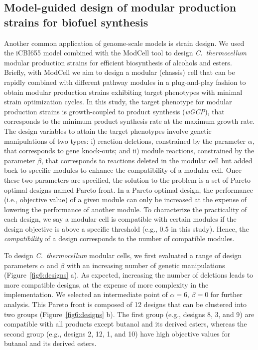 \subsection{Model-guided design of modular production strains for biofuel synthesis}

Another common application of genome-scale models is strain design.\citep{long2015, ng2015, maranas2016, wang2018, garcia2019, garcia2019b, garcia2019c}
We used the iCBI655 model combined with the ModCell tool\citep{garcia2020b} to design \textit{C.~thermocellum} modular production strains for efficient biosynthesis of alcohols and esters.
Briefly, with ModCell we aim to design a modular (chassis) cell that can be rapidly combined with different pathway modules in a plug-and-play fashion to obtain modular production strains exhibiting target phenotypes with minimal strain optimization cycles.
In this study, the target phenotype for modular production strains is growth-coupled to product synthesis (\textit{wGCP}), that corresponds to the minimum product synthesis rate at the maximum growth rate.
The design variables to attain the target phenotypes involve genetic manipulations of two types: i) reaction deletions, constrained by the parameter $\alpha$, that corresponds to gene knock-outs; and ii) module reactions, constrained by the parameter $\beta$, that corresponds to reactions deleted in the modular cell but added back to specific modules to enhance the compatibility of a modular cell. Once these two parameters are specified, the solution to the problem is a set of Pareto optimal designs named Pareto front. In a Pareto optimal design, the performance (i.e., objective value) of a given module can only be increased at the expense of lowering the performance of another module.
To characterize the practicality of each design, we say a modular cell is compatible with certain modules if the design objective is above a specific threshold (e.g., 0.5 in this study). Hence, the \emph{compatibility} of a design corresponds to the number of compatible modules.

To design \textit{C.~thermocellum} modular cells, we first evaluated a range of design parameters $\alpha$ and $\beta$ with an increasing number of genetic manipulations (Figure~\ref{fig6:designs} a).
As expected, increasing the number of deletions leads to more compatible designs, at the expense of more complexity in the implementation.
We selected an intermediate point of $\alpha=6,\, \beta=0$ for further analysis.
This Pareto front is composed of 12 designs that can be clustered into two groups (Figure~\ref{fig6:designs} b).
The first group (e.g., designs 8, 3, and 9) are compatible with all products except butanol and its derived esters, whereas the second group (e.g., designs 2, 12, 1, and 10) have high objective values for butanol and its derived esters.

